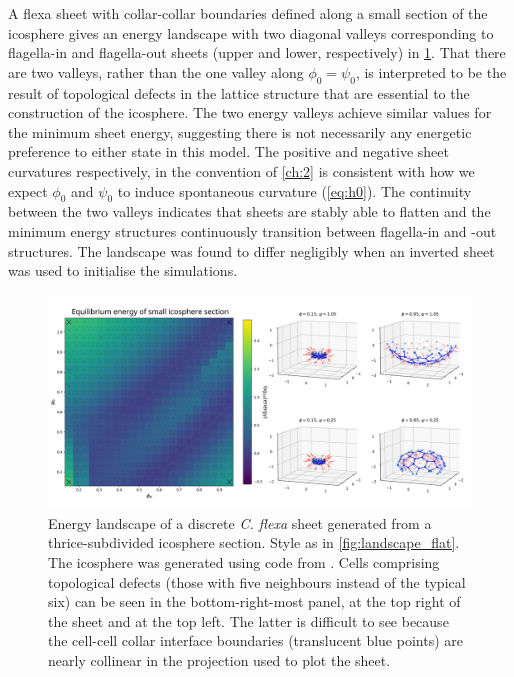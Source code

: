 A flexa sheet with collar-collar boundaries defined along a small section of the icosphere gives an energy landscape with two diagonal valleys corresponding to flagella-in and flagella-out sheets (upper and lower, respectively) in \cref{fig:landscape_ico}.
That there are two valleys, rather than the one valley along $\phi_0 = \psi_0$, is interpreted to be the result of topological defects in the lattice structure that are essential to the construction of the icosphere. 
The two energy valleys achieve similar values for the minimum sheet energy, suggesting there is not necessarily any energetic preference to either state in this model.
The positive and negative sheet curvatures respectively, in the convention of \cref{ch:2} is consistent with how we expect $\phi_0$ and $\psi_0$ to induce spontaneous curvature (\cref{eq:h0}).
The continuity between the two valleys indicates that sheets are stably able to flatten and the minimum energy structures continuously transition between flagella-in and -out structures. 
The landscape was found to differ negligibly when an inverted sheet was used to initialise the simulations.

\begin{figure}[hbtp]
	\centering
	\includegraphics[width=\textwidth]{landscape_ico.png}
	\caption[Energy landscape of a discrete \textit{C. flexa} sheet generated from a small icosphere section]{Energy landscape of a discrete \textit{C. flexa} sheet generated from a thrice-subdivided icosphere section. Style as in \cref{fig:landscape_flat}. The icosphere was generated using code from \citep{dahl2014}. Cells comprising topological defects (those with five neighbours instead of the typical six) can be seen in the bottom-right-most panel, at the top right of the sheet and at the top left. The latter is difficult to see because the cell-cell collar interface boundaries (translucent blue points) are nearly collinear in the projection used to plot the sheet.}
	\label{fig:landscape_ico}
\end{figure}

